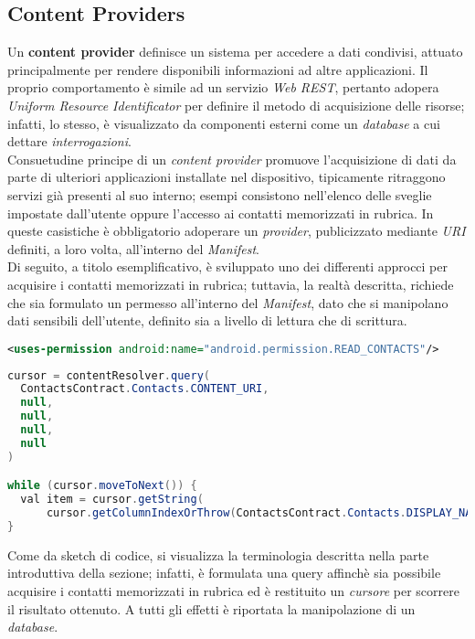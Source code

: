 \documentclass{article}
\begin{document}
\subsection*{Content Providers}
Un \textbf{content provider} definisce un sistema per accedere a dati condivisi, attuato principalmente per rendere disponibili informazioni ad altre applicazioni. Il proprio comportamento è simile ad un servizio \textit{Web REST}, pertanto adopera \textit{Uniform Resource Identificator} per definire il metodo di acquisizione delle risorse; infatti, lo stesso, è visualizzato da componenti esterni come un \textit{database} a cui dettare \textit{interrogazioni}.\vspace*{7pt}\\
Consuetudine principe di un \textit{content provider} promuove l'acquisizione di dati da parte di ulteriori applicazioni installate nel dispositivo, tipicamente ritraggono servizi già presenti al suo interno; esempi consistono nell'elenco delle sveglie impostate dall'utente oppure l'accesso ai contatti memorizzati in rubrica. In queste casistiche è obbligatorio adoperare un \textit{provider}, publicizzato mediante \textit{URI} definiti, a loro volta, all'interno del \textit{Manifest}.\vspace*{7pt}\\
Di seguito, a titolo esemplificativo, è sviluppato uno dei differenti approcci per acquisire i contatti memorizzati in rubrica; tuttavia, la realtà descritta, richiede che sia formulato un permesso all'interno del \textit{Manifest}, dato che si manipolano dati sensibili dell'utente, definito sia a livello di lettura che di scrittura.
\begin{lstlisting}[language=XML]
<uses-permission android:name="android.permission.READ_CONTACTS"/>
\end{lstlisting}
\begin{lstlisting}[language=JAVA]
cursor = contentResolver.query(
  ContactsContract.Contacts.CONTENT_URI,
  null,
  null,
  null,
  null
)

while (cursor.moveToNext()) {
  val item = cursor.getString(
      cursor.getColumnIndexOrThrow(ContactsContract.Contacts.DISPLAY_NAME))
}
\end{lstlisting}
Come da sketch di codice, si visualizza la terminologia descritta nella parte introduttiva della sezione; infatti, è formulata una query affinchè sia possibile acquisire i contatti memorizzati in rubrica ed è restituito un \textit{cursore} per scorrere il risultato ottenuto. A tutti gli effetti è riportata la manipolazione di un \textit{database}.
\end{document}
